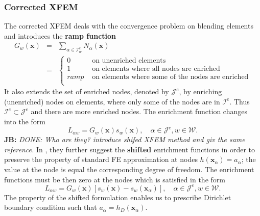 \documentclass[preprint,12pt]{elsarticle}
\def\vc#1{\mathbf{\boldsymbol{#1}}}     %
\newcommand{\bx}{\vc{x}}
\newcommand{\noteJB}[1]{{\color{Blue} \textbf{JB: } \textit{#1}}}
\begin{document}
\subsubsection{Corrected XFEM}
The corrected XFEM \cite{cxfem} deals with the convergence problem on blending elements and 
introduces the \textbf{ramp function}
\begin{eqnarray} \label{eqn:ramp_function}
  G_w(\bx) &=& \sum \limits_{\alpha\in\mathcal{I}_w^e} N_\alpha(\bx)    \\
  &=& 
  \begin{cases}
    0 & \textrm{ on unenriched elements}    \\
    1 & \textrm{ on elements where all nodes are enriched}    \\
    ramp & \textrm{ on elements where some of the nodes are enriched}    \\
  \end{cases} \nonumber
\end{eqnarray}
It also extends the set of enriched nodes, denoted by $\mathcal{J}^e$, by enriching (unenriched) nodes 
on elements, where only some of the nodes are in $\mathcal{I}^e$. Thus $\mathcal{I}^e\subset\mathcal{J}^e$ 
and there are more enriched nodes.
The enrichment function changes into the form
\begin{equation} \label{eqn:xfem_ramp}
    L_{\alpha w} = G_w(\bx) s_{w}(\bx), \quad \alpha\in\mathcal{J}^e, w\in\mathcal{W}.
\end{equation}
\noteJB{DONE: Who are they? introduce shifed XFEM method and giv the same reference.}
In \cite{cxfem}, they 
further suggest the \textbf{shifted} enrichment functions in order to preserve the property of standard 
FE approximation at nodes $h(\bx_\alpha)=a_\alpha$; the value at the node is equal the corresponding degree
of freedom. The enrichment functions must be then zero at the nodes which is satisfied in the form
\begin{equation} \label{eqn:xfem_shift}
    L_{\alpha w} = G_w(\bx) \left[s_w(\bx) - s_w(\bx_\alpha)\right],
    \quad \alpha\in\mathcal{J}^e, w\in\mathcal{W}.
\end{equation} 
The property of the shifted formulation enables us to prescribe Dirichlet boundary condition such that
$a_\alpha = h_D(\bx_\alpha)$.
\end{document}
